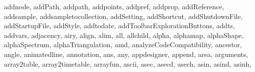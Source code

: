 {{        addnode,%
        addPath,%
        addpath,%
        addpoints,%
        addpref,%
        addprop,%
        addReference,%
        addsample,%
        addsampletocollection,%
        addSetting,%
        addShortcut,%
        addShutdownFile,%
        addStartupFile,%
        addStyle,%
        addtodate,%
        addToolbarExplorationButtons,%
        addts,%
        addvars,%
        adjacency,%
        airy,%
        align,%
        alim,%
        all,%
        allchild,%
        alpha,%
        alphamap,%
        alphaShape,%
        alphaSpectrum,%
        alphaTriangulation,%
        amd,%
        analyzeCodeCompatibility,%
        ancestor,%
        angle,%
        animatedline,%
        annotation,%
        ans,%
        any,%
        appdesigner,%
        append,%
        area,%
        arguments,%
        array2table,%
        array2timetable,%
        arrayfun,%
        ascii,%
        asec,%
        asecd,%
        asech,%
        asin,%
        asind,%
        asinh,%
}}
